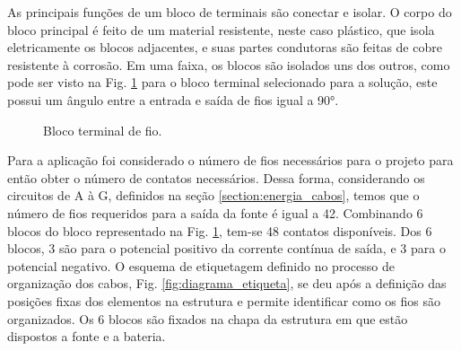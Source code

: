 As principais funções de um bloco de terminais são conectar e isolar. O corpo do bloco principal é feito de um material resistente, neste caso plástico, que isola eletricamente os blocos adjacentes, e suas partes condutoras são feitas de cobre resistente à corrosão. Em uma faixa, os blocos são isolados uns dos outros, como pode ser visto na Fig. \ref{fig:energia_bloco} para o bloco terminal selecionado para a solução, este possui um ângulo entre a entrada e saída de fios igual a 90°.

\begin{figure}[H]
\centering
{}
\qquad
{}
\caption{Bloco terminal de fio.}
\label{fig:energia_bloco}
\end{figure}

Para a aplicação foi considerado o número de fios necessários para o projeto para então obter o número de contatos necessários. Dessa forma, considerando os circuitos de A à G, definidos na seção \ref{section:energia_cabos}, temos que o número de fios requeridos para a saída da fonte é igual a 42. Combinando 6 blocos do bloco representado na Fig. \ref{fig:energia_bloco}, tem-se 48 contatos disponíveis. Dos 6 blocos, 3 são para o potencial positivo da corrente contínua de saída, e 3 para o potencial negativo. O esquema de etiquetagem definido no processo de organização dos cabos, Fig. \ref{fig:diagrama_etiqueta}, se deu após a definição das posições fixas dos elementos na estrutura e permite identificar como os fios são organizados. Os 6 blocos são fixados na chapa da estrutura em que estão dispostos a fonte e a bateria. 

